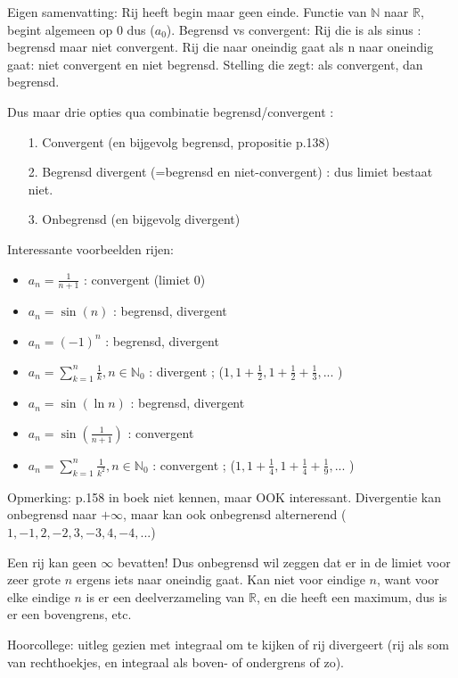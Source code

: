 \documentclass{article}
\begin{document}
Eigen samenvatting: 
Rij heeft begin maar geen einde. Functie van $\mathbb{N}$  naar $\mathbb{R}$, begint algemeen op 0 dus ($a_0$).
Begrensd vs convergent: 
Rij die is als sinus : begrensd maar niet convergent. 
Rij die naar oneindig gaat als n naar oneindig gaat: niet convergent en niet begrensd. 
Stelling die zegt: als convergent, dan begrensd. 

Dus maar drie opties qua combinatie begrensd/convergent : 
\begin{itemize}
    \item [1.] Convergent (en bijgevolg begrensd, propositie p.138) 
    \item [2.] Begrensd divergent (=begrensd en niet-convergent) : dus limiet bestaat niet. 
    \item [3.] Onbegrensd (en bijgevolg divergent) 
\end{itemize}

Interessante voorbeelden rijen: 

\begin{itemize}
    \item $a_n=\frac{1}{n+1}$ : convergent (limiet 0) 
    \item $a_n=\sin(n)$ : begrensd, divergent
    \item $a_n= (-1)^n$ : begrensd, divergent
    \item $a_n = \sum_{k=1}^{n} \frac{1}{k} , n \in \mathbb{N}_0$ : divergent ; ($1, 1+\frac{1}{2},1+\frac{1}{2} +\frac{1}{3}, ...$ )
    \item $a_n = \sin(\ln n)$ : begrensd, divergent
    \item $a_n = \sin(\frac{1}{n+1})$ : convergent 
    \item $a_n = \sum_{k=1}^{n} \frac{1}{k^2} , n \in \mathbb{N}_0$ : convergent ; ($1, 1+\frac{1}{4},1+\frac{1}{4} +\frac{1}{9}, ...$ )
\end{itemize}

Opmerking: p.158 in boek niet kennen, maar OOK interessant. Divergentie kan onbegrensd naar $+\infty$, maar kan ook onbegrensd alternerend ($1,-1,2,-2,3,-3,4,-4,...$)

Een rij kan geen $\infty$ bevatten! Dus onbegrensd wil zeggen dat er in de limiet voor zeer grote $n$ ergens iets naar oneindig gaat. Kan niet voor eindige $n$, want voor elke eindige $n$ is er een deelverzameling van $\mathbb{R}$, en die heeft een maximum, dus is er een bovengrens, etc. 

Hoorcollege: uitleg gezien met integraal om te kijken of rij divergeert (rij als som van rechthoekjes, en integraal als boven- of ondergrens of zo). 
\end{document}
